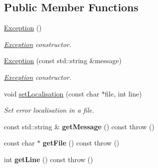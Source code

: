 \subsection*{Public Member Functions}
\begin{DoxyCompactItemize}
\item 
\hypertarget{class_f_t_p_1_1_exception_a2451744502231316fb25c76b9d0e4ad0}{\hyperlink{class_f_t_p_1_1_exception_a2451744502231316fb25c76b9d0e4ad0}{Exception} ()}\label{class_f_t_p_1_1_exception_a2451744502231316fb25c76b9d0e4ad0}

\begin{DoxyCompactList}\small\item\em \hyperlink{class_f_t_p_1_1_exception}{Exception} constructor. \end{DoxyCompactList}\item 
\hyperlink{class_f_t_p_1_1_exception_a2c62e4f58bf71065327a509d87cd1ae0}{Exception} (const std\-::string \&message)
\begin{DoxyCompactList}\small\item\em \hyperlink{class_f_t_p_1_1_exception}{Exception} constructor. \end{DoxyCompactList}\item 
void \hyperlink{class_f_t_p_1_1_exception_a462325fec2828a1cc5d06b9b1994dc49}{set\-Localisation} (const char $\ast$file, int line)
\begin{DoxyCompactList}\small\item\em Set error localisation in a file. \end{DoxyCompactList}\item 
\hypertarget{class_f_t_p_1_1_exception_ab8184759911a05c6ff47b0807237fae9}{const std\-::string \& {\bfseries get\-Message} () const   throw ()}\label{class_f_t_p_1_1_exception_ab8184759911a05c6ff47b0807237fae9}

\item 
\hypertarget{class_f_t_p_1_1_exception_a16f83d3adfebfb58402c761d337e7ff0}{const char $\ast$ {\bfseries get\-File} () const   throw ()}\label{class_f_t_p_1_1_exception_a16f83d3adfebfb58402c761d337e7ff0}

\item 
\hypertarget{class_f_t_p_1_1_exception_a76b9ea580b17dc54d29b1e42525711c2}{int {\bfseries get\-Line} () const   throw ()}\label{class_f_t_p_1_1_exception_a76b9ea580b17dc54d29b1e42525711c2}

\end{DoxyCompactItemize}


